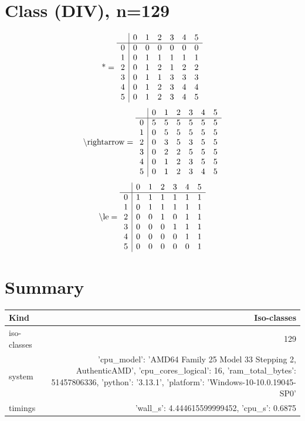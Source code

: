 \documentclass[11pt]{article}
\begin{document}
\section{Class (DIV), n=129}
\[\text{*} = 
\begin{array}{r | r r r r r r}
 & 0 & 1 & 2 & 3 & 4 & 5 \\ \hline
0 & 0 & 0 & 0 & 0 & 0 & 0 \\
1 & 0 & 1 & 1 & 1 & 1 & 1 \\
2 & 0 & 1 & 2 & 1 & 2 & 2 \\
3 & 0 & 1 & 1 & 3 & 3 & 3 \\
4 & 0 & 1 & 2 & 3 & 4 & 4 \\
5 & 0 & 1 & 2 & 3 & 4 & 5 \\
\end{array}
\]
\[\text{\textbackslash rightarrow} = 
\begin{array}{r | r r r r r r}
 & 0 & 1 & 2 & 3 & 4 & 5 \\ \hline
0 & 5 & 5 & 5 & 5 & 5 & 5 \\
1 & 0 & 5 & 5 & 5 & 5 & 5 \\
2 & 0 & 3 & 5 & 3 & 5 & 5 \\
3 & 0 & 2 & 2 & 5 & 5 & 5 \\
4 & 0 & 1 & 2 & 3 & 5 & 5 \\
5 & 0 & 1 & 2 & 3 & 4 & 5 \\
\end{array}
\]
\[\text{\textbackslash le} = 
\begin{array}{r | r r r r r r}
 & 0 & 1 & 2 & 3 & 4 & 5 \\ \hline
0 & 1 & 1 & 1 & 1 & 1 & 1 \\
1 & 0 & 1 & 1 & 1 & 1 & 1 \\
2 & 0 & 0 & 1 & 0 & 1 & 1 \\
3 & 0 & 0 & 0 & 1 & 1 & 1 \\
4 & 0 & 0 & 0 & 0 & 1 & 1 \\
5 & 0 & 0 & 0 & 0 & 0 & 1 \\
\end{array}
\]

\section*{Summary}
\begin{tabular}{lr}
\toprule
Kind & Iso-classes\\\midrule
iso-classes & 129\\
system & {'cpu_model': 'AMD64 Family 25 Model 33 Stepping 2, AuthenticAMD', 'cpu_cores_logical': 16, 'ram_total_bytes': 51457806336, 'python': '3.13.1', 'platform': 'Windows-10-10.0.19045-SP0'}\\
timings & {'wall_s': 4.444615599999452, 'cpu_s': 0.6875}\\
\bottomrule
\end{tabular}
\end{document}
